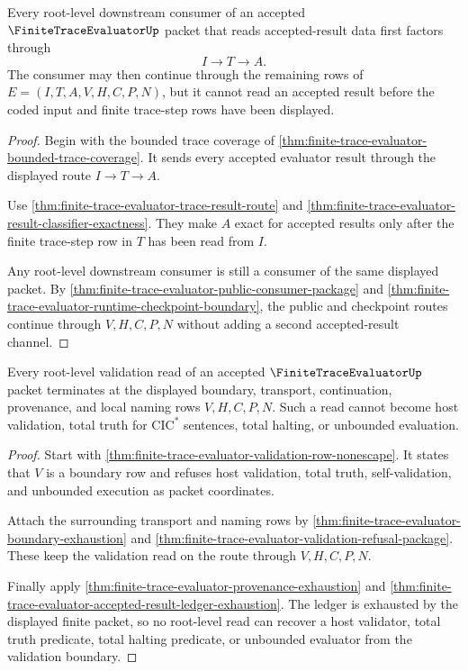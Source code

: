 \begin{theorem}
\label{thm:finite-trace-evaluator-root-trace-result-totality}
Every root-level downstream consumer of an accepted $\FiniteTraceEvaluatorUp$
packet that reads accepted-result data first factors through
$$
I \to T \to A.
$$
The consumer may then continue through the remaining rows of
$E=(I,T,A,V,H,C,P,N)$, but it cannot read an accepted result before the coded
input and finite trace-step rows have been displayed.
\end{theorem}
\begin{proof}
Begin with the bounded trace coverage of
\autoref{thm:finite-trace-evaluator-bounded-trace-coverage}. It sends every
accepted evaluator result through the displayed route $I \to T \to A$.

Use \autoref{thm:finite-trace-evaluator-trace-result-route} and
\autoref{thm:finite-trace-evaluator-result-classifier-exactness}. They make
$A$ exact for accepted results only after the finite trace-step row in $T$ has
been read from $I$.

Any root-level downstream consumer is still a consumer of the same displayed
packet. By \autoref{thm:finite-trace-evaluator-public-consumer-package} and
\autoref{thm:finite-trace-evaluator-runtime-checkpoint-boundary}, the public
and checkpoint routes continue through $V,H,C,P,N$ without adding a second
accepted-result channel.
\end{proof}

\begin{theorem}
\label{thm:finite-trace-evaluator-root-validation-boundary}
Every root-level validation read of an accepted $\FiniteTraceEvaluatorUp$
packet terminates at the displayed boundary, transport, continuation,
provenance, and local naming rows $V,H,C,P,N$. Such a read cannot become host
validation, total truth for $\mathrm{CIC}^{*}$ sentences, total halting, or
unbounded evaluation.
\end{theorem}
\begin{proof}
Start with \autoref{thm:finite-trace-evaluator-validation-row-nonescape}. It
states that $V$ is a boundary row and refuses host validation, total truth,
self-validation, and unbounded execution as packet coordinates.

Attach the surrounding transport and naming rows by
\autoref{thm:finite-trace-evaluator-boundary-exhaustion} and
\autoref{thm:finite-trace-evaluator-validation-refusal-package}. These keep
the validation read on the route through $V,H,C,P,N$.

Finally apply \autoref{thm:finite-trace-evaluator-provenance-exhaustion} and
\autoref{thm:finite-trace-evaluator-accepted-result-ledger-exhaustion}. The
ledger is exhausted by the displayed finite packet, so no root-level read can
recover a host validator, total truth predicate, total halting predicate, or
unbounded evaluator from the validation boundary.
\end{proof}

